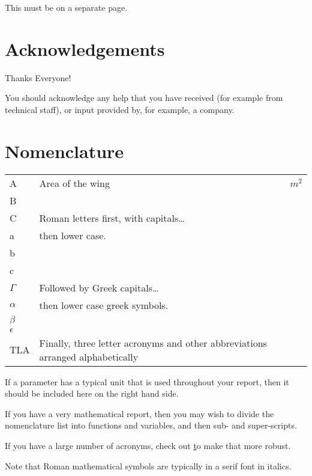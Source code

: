 \documentclass[a4paper,oneside,12pt]{book}
\numberwithin{equation}{chapter} %
\begin{document}
This must be on a separate page.

\newpage
\onehalfspacing\raggedright %

\section*{\Huge\textcolor{tcd_blue}{Acknowledgements}}
Thanks Everyone!

You should acknowledge any help that you have received (for example from technical staff), or input provided by, for example, a company.
\tableofcontents
\listoffigures
\listoftables
\newpage
\section*{\Huge\textcolor{tcd_blue}{Nomenclature}}
\begin{tabular}{lp{9cm}l}
A&Area of the wing&$m^{2}$\\
B\\
C& Roman letters first, with capitals\ldots\\
a&then lower case.\\
b\\
c\\
$\Gamma$&Followed by Greek capitals\ldots\\
$\alpha$&then lower case greek symbols.\\
$\beta$\\
$\epsilon$\\
TLA&Finally, three letter acronyms and other abbreviations arranged alphabetically\\
\end{tabular}
\vspace{2cm}

If a parameter has a typical unit that is used throughout your report, then it should be included here on the right hand side.

If you have a very mathematical report, then you may wish to divide the nomenclature list into functions and variables, and then sub- and super-scripts.

If you have a large number of acronyms, check out \href{https://www.overleaf.com/learn/latex/Glossaries} to make that more robust.

Note that Roman mathematical symbols are typically in a serif font in italics.

\mainmatter







%


\appendix
\renewcommand{\thechapter}{A\arabic{chapter}}

\end{document}
